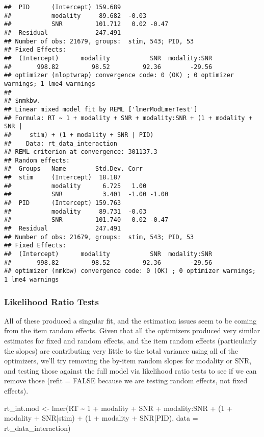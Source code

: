 \documentclass[
]{article}
\newenvironment{Shaded}{\begin{snugshade}}{\end{snugshade}}
\newcommand{\AttributeTok}[1]{\textcolor[rgb]{0.77,0.63,0.00}{#1}}
\newcommand{\DecValTok}[1]{\textcolor[rgb]{0.00,0.00,0.81}{#1}}
\newcommand{\FunctionTok}[1]{\textcolor[rgb]{0.00,0.00,0.00}{#1}}
\newcommand{\NormalTok}[1]{#1}
\newcommand{\OtherTok}[1]{\textcolor[rgb]{0.56,0.35,0.01}{#1}}
\newcommand{\SpecialCharTok}[1]{\textcolor[rgb]{0.00,0.00,0.00}{#1}}
\begin{document}
\begin{verbatim}
##  PID      (Intercept) 159.689             
##           modality     89.682  -0.03      
##           SNR         101.712   0.02 -0.47
##  Residual             247.491             
## Number of obs: 21679, groups:  stim, 543; PID, 53
## Fixed Effects:
##  (Intercept)      modality           SNR  modality:SNR  
##       998.82         98.52         92.36        -29.56  
## optimizer (nloptwrap) convergence code: 0 (OK) ; 0 optimizer warnings; 1 lme4 warnings 
## 
## $nmkbw.
## Linear mixed model fit by REML ['lmerModLmerTest']
## Formula: RT ~ 1 + modality + SNR + modality:SNR + (1 + modality + SNR |  
##     stim) + (1 + modality + SNR | PID)
##    Data: rt_data_interaction
## REML criterion at convergence: 301137.3
## Random effects:
##  Groups   Name        Std.Dev. Corr       
##  stim     (Intercept)  18.187             
##           modality      6.725   1.00      
##           SNR           3.401  -1.00 -1.00
##  PID      (Intercept) 159.763             
##           modality     89.731  -0.03      
##           SNR         101.740   0.02 -0.47
##  Residual             247.491             
## Number of obs: 21679, groups:  stim, 543; PID, 53
## Fixed Effects:
##  (Intercept)      modality           SNR  modality:SNR  
##       998.82         98.52         92.36        -29.56  
## optimizer (nmkbw) convergence code: 0 (OK) ; 0 optimizer warnings; 1 lme4 warnings
\end{verbatim}

\hypertarget{likelihood-ratio-tests}{%
\subsubsection{Likelihood Ratio Tests}\label{likelihood-ratio-tests}}

All of these produced a singular fit, and the estimation issues seem to
be coming from the item random effects. Given that all the optimizers
produced very similar estimates for fixed and random effects, and the
item random effects (particularly the slopes) are contributing very
little to the total variance using all of the optimizers, we'll try
removing the by-item random slopes for modality or SNR, and testing
those against the full model via likelihood ratio tests to see if we can
remove those (refit = FALSE because we are testing random effects, not
fixed effects).

\begin{Shaded}
\begin{Highlighting}[]
\NormalTok{rt\_int.mod }\OtherTok{\textless{}{-}} \FunctionTok{lmer}\NormalTok{(RT }\SpecialCharTok{\textasciitilde{}} \DecValTok{1} \SpecialCharTok{+}\NormalTok{ modality }\SpecialCharTok{+}\NormalTok{ SNR }\SpecialCharTok{+}\NormalTok{ modality}\SpecialCharTok{:}\NormalTok{SNR }\SpecialCharTok{+}
\NormalTok{                     (}\DecValTok{1} \SpecialCharTok{+}\NormalTok{ modality }\SpecialCharTok{+}\NormalTok{ SNR}\SpecialCharTok{|}\NormalTok{stim) }\SpecialCharTok{+}\NormalTok{ (}\DecValTok{1} \SpecialCharTok{+}\NormalTok{ modality }\SpecialCharTok{+}\NormalTok{ SNR}\SpecialCharTok{|}\NormalTok{PID), }
                   \AttributeTok{data =}\NormalTok{ rt\_data\_interaction)}
\end{Highlighting}
\end{Shaded}
\end{document}
